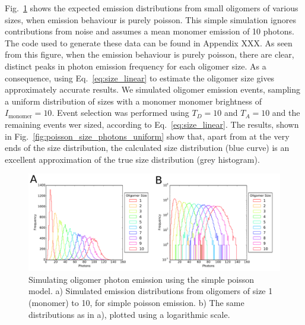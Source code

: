 Fig.~\ref{fig:poisson_size_photons} shows the expected emission distributions from small oligomers of various sizes, when emission behaviour is purely poisson. This simple simulation ignores contributions from noise and assumes a mean monomer emission of 10 photons. The code used to generate these data can be found in Appendix XXX. As seen from this figure, when the emission behaviour is purely poisson, there are clear, distinct peaks in photon emission frequency for each oligomer size. As a consequence, using Eq.~\ref{eq:size_linear} to estimate the oligomer size gives approximately accurate results. We simulated oligomer emission events, sampling a uniform distribution of sizes with a monomer monomer brightness of $I_{\text{monomer}} = 10$. Event selection was performed using $T_D = 10$ and $T_A = 10$ and the remaining events wer sized, according to Eq.~\ref{eq:size_linear}. The results, shown in Fig.~\ref{fig:poisson_size_photons_uniform} show that, apart from at the very ends of the size distribution, the calculated size distribution (blue curve) is an excellent approximation of the true size distribution (grey histogram).        

\begin{figure}
   \begin{center}
      \includegraphics*[clip=true, width=6in]{sizing/poisson_size_photons.pdf}
      \caption{Simulating oligomer photon emission using the simple poisson model. a) Simulated emission distributions from oligomers of size 1 (monomer) to 10, for simple poisson emission. b) The same distributions as in a), plotted using a logarithmic scale.}
      \label{fig:poisson_size_photons}
   \end{center}
\end{figure}


